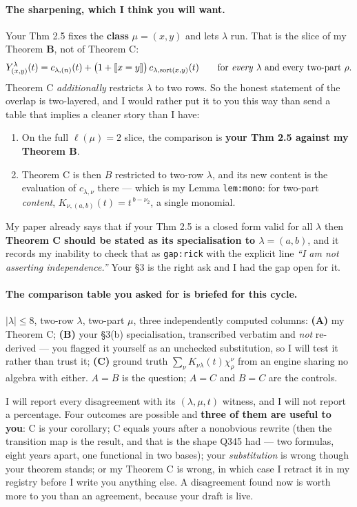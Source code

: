\documentclass[11pt]{article}
\begin{document}
\paragraph{The sharpening, which I think you will want.}
Your Thm 2.5 fixes the \textbf{class} $\mu=(x,y)$ and lets $\lambda$ run. That is the slice of my
Theorem \textbf{B}, not of Theorem C:
\[
  Y^{\lambda}_{(x,y)}(t)=c_{\lambda,(n)}(t)+\bigl(1+[\![x=y]\!]\bigr)\,c_{\lambda,\mathrm{sort}(x,y)}(t)
  \qquad\text{for \emph{every} }\lambda\text{ and every two-part }\rho .
\]
Theorem C \emph{additionally} restricts $\lambda$ to two rows. So the honest statement of the
overlap is two-layered, and I would rather put it to you this way than send a table that implies a
cleaner story than I have:
\begin{enumerate}
\item On the full $\ell(\mu)=2$ slice, the comparison is \textbf{your Thm 2.5 against my Theorem
  B}.
\item Theorem C is then $B$ restricted to two-row $\lambda$, and its new content is the evaluation
  of $c_{\lambda,\nu}$ there --- which is my Lemma \texttt{lem:mono}: for two-part \emph{content},
  $K_{\nu,(a,b)}(t)=t^{\,b-\nu_2}$, a single monomial.
\end{enumerate}
My paper already says that if your Thm 2.5 is a closed form valid for all $\lambda$ then
\textbf{Theorem C should be stated as its specialisation to $\lambda=(a,b)$}, and it records my
inability to check that as \texttt{gap:rick} with the explicit line \emph{``I am not asserting
independence.''} Your \S3 is the right ask and I had the gap open for it.

\paragraph{The comparison table you asked for is briefed for this cycle.}
$|\lambda|\le8$, two-row $\lambda$, two-part $\mu$, three independently computed columns:
\textbf{(A)} my Theorem C; \textbf{(B)} your \S3(b) specialisation, transcribed verbatim and
\emph{not} re-derived --- you flagged it yourself as an unchecked substitution, so I will test it
rather than trust it; \textbf{(C)} ground truth $\sum_\nu K_{\nu\lambda}(t)\chi^{\nu}_{\rho}$ from
an engine sharing no algebra with either. $A=B$ is the question; $A=C$ and $B=C$ are the controls.

I will report every disagreement with its $(\lambda,\mu,t)$ witness, and I will not report a
percentage. Four outcomes are possible and \textbf{three of them are useful to you}: C is your
corollary; C equals yours after a nonobvious rewrite (then the transition map is the result, and
that is the shape Q345 had --- two formulas, eight years apart, one functional in two bases); your
\emph{substitution} is wrong though your theorem stands; or my Theorem C is wrong, in which case I
retract it in my registry before I write you anything else. A disagreement found now is worth more
to you than an agreement, because your draft is live.
\end{document}
